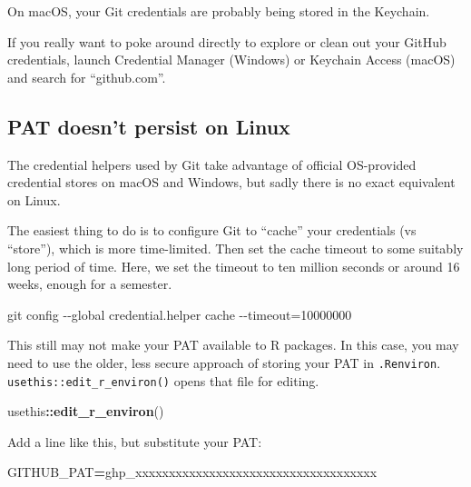 \documentclass[
]{book}
\newenvironment{Shaded}{\begin{snugshade}}{\end{snugshade}}
\newcommand{\FunctionTok}[1]{\textcolor[rgb]{0.13,0.29,0.53}{\textbf{#1}}}
\newcommand{\NormalTok}[1]{#1}
\newcommand{\OperatorTok}[1]{\textcolor[rgb]{0.81,0.36,0.00}{\textbf{#1}}}
\newcommand{\SpecialCharTok}[1]{\textcolor[rgb]{0.81,0.36,0.00}{\textbf{#1}}}
\newcommand{\VariableTok}[1]{\textcolor[rgb]{0.00,0.00,0.00}{#1}}
\begin{document}
On macOS, your Git credentials are probably being stored in the Keychain.

If you really want to poke around directly to explore or clean out your GitHub credentials, launch Credential Manager (Windows) or Keychain Access (macOS) and search for ``github.com''.

\subsection{PAT doesn't persist on Linux}\label{pat-doesnt-persist-on-linux}

The credential helpers used by Git take advantage of official OS-provided
credential stores on macOS and Windows, but sadly there is no exact equivalent on Linux.

The easiest thing to do is to configure Git to ``cache'' your credentials (vs ``store''), which is more time-limited.
Then set the cache timeout to some suitably long period of time.
Here, we set the timeout to ten million seconds or around 16 weeks, enough for a semester.

\begin{Shaded}
\begin{Highlighting}[]
\NormalTok{git config {-}{-}global credential.helper \textquotesingle{}cache {-}{-}timeout=10000000\textquotesingle{}}
\end{Highlighting}
\end{Shaded}

This still may not make your PAT available to R packages.
In this case, you may need to use the older, less secure approach of storing your PAT in \texttt{.Renviron}.
\texttt{usethis::edit\_r\_environ()} opens that file for editing.

\begin{Shaded}
\begin{Highlighting}[]
\NormalTok{usethis}\SpecialCharTok{::}\FunctionTok{edit\_r\_environ}\NormalTok{()}
\end{Highlighting}
\end{Shaded}

Add a line like this, but substitute your PAT:

\begin{Shaded}
\begin{Highlighting}[]
\VariableTok{GITHUB\_PAT}\OperatorTok{=}\NormalTok{ghp\_xxxxxxxxxxxxxxxxxxxxxxxxxxxxxxxxxxxx}
\end{Highlighting}
\end{Shaded}
\end{document}

